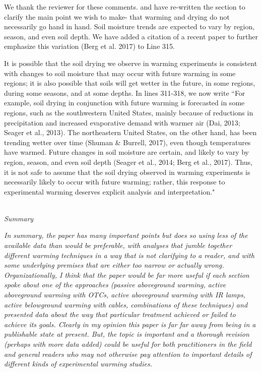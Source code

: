 \documentclass[11pt,a4paper]{letter}
\begin{document}
\begin{letter}{}
\par We thank the reviewer for these comments. and have re-written the section to clarify the main point we wish to make- that warming and drying do not necessarily go hand in hand. Soil moisture trends are expected to vary by region, season, and even soil depth. We have added a citation of a recent paper to further emphasize this variation (Berg et al. 2017) to Line 315. 

\par It is possible that the soil drying we observe in warming experiments is consistent with changes to soil moisture that may occur with future warming in some regions; it is also possible that soils will get wetter in the future, in some regions, during some seasons, and at some depths. In lines 311-318, we now write ``For example, soil drying in conjunction with future warming is forecasted in some regions, such as the southwestern United States, mainly because of reductions in precipitation and increased evaporative demand with warmer air (Dai, 2013; Seager et al., 2013). The northeastern United States, on the other hand, has been trending wetter over time (Shuman \& Burrell, 2017), even though temperatures have warmed. Future changes in soil moisture are certain, and likely to vary by region, season, and even soil depth (Seager et al., 2014; Berg et al., 2017). Thus, it is not safe to assume that the soil drying observed in warming experiments is necessarily likely to occur with future warming; rather, this response to experimental warming deserves explicit analysis and interpretation."

\\
\emph{Summary}

\emph{In summary, the paper has many important points but does so using less of the available data
than would be preferable, with analyses that jumble together different warming techniques in a
way that is not clarifying to a reader, and with some underlying premises that are either too
narrow or actually wrong. Organizationally, I think that the paper would be far more useful if
each section spoke about one of the approaches (passive aboveground warming, active
aboveground warming with OTCs, active aboveground warming with IR lamps, active
belowground warming with cables, combinations of these techniques) and presented data
about the way that particular treatment achieved or failed to achieve its goals. Clearly in my
opinion this paper is far far away from being in a publishable state at present. But, the topic is
important and a thorough revision (perhaps with more data added) could be useful for both
practitioners in the field and general readers who may not otherwise pay attention to
important details of different kinds of experimental warming studies.}


\end{letter}
\end{document}
